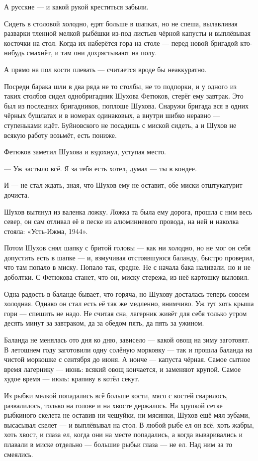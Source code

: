А русские --- и какой рукой креститься забыли.

Сидеть в столовой холодно, едят больше в шапках, но не спеша, вылавливая разварки тленной
мелкой рыбёшки из-под листьев чёрной капусты и выплёвывая косточки на стол. Когда их
наберётся гора на столе --- перед новой бригадой кто-нибудь смахнёт, и там они дохрястывают на
полу.

А прямо на пол кости плевать --- считается вроде бы неаккуратно.

Посреди барака шли в два ряда не то столбы, не то подпорки, и у одного из таких столбов сидел
однобригадник Шухова Фетюков, стерёг ему завтрак. Это был из последних бригадников, поплоше
Шухова. Снаружи бригада вся в одних чёрных бушлатах и в номерах одинаковых, а внутри шибко
неравно --- ступеньками идёт. Буйновского не посадишь с миской сидеть, а и Шухов не всякую
работу возьмёт, есть пониже.

Фетюков заметил Шухова и вздохнул, уступая место.

--- Уж застыло всё. Я за тебя есть хотел, думал --- ты в кондее.

И --- не стал ждать, зная, что Шухов ему не оставит, обе миски отштукатурит дочиста.

Шухов вытянул из валенка ложку. Ложка та была ему дорога, прошла с ним весь север, он сам
отливал её в песке из алюминиевого провода, на ней и наколка стояла: «Усть-Ижма, 1944».

Потом Шухов снял шапку с бритой головы --- как ни холодно, но не мог он себя допустить есть в
шапке --- и, взмучивая отстоявшуюся баланду, быстро проверил, что там попало в миску. Попало
так, средне. Не с начала бака наливали, но и не доболтки. С Фетюкова станет, что он, миску
стережа, из неё картошку выловил.

Одна радость в баланде бывает, что горяча, но Шухову досталась теперь совсем холодная.
Однако он стал есть её так же медленно, внимчиво. Уж тут хоть крыша гори --- спешить не надо. Не
считая сна, лагерник живёт для себя только утром десять минут за завтраком, да за обедом
пять, да пять за ужином.

Баланда не менялась ото дня ко дню, зависело --- какой овощ на зиму заготовят. В летошнем году
заготовили одну солёную морковку --- так и прошла баланда на чистой моркошке с сентября до
июня. А нонче --- капуста чёрная. Самое сытное время лагернику --- июнь: всякий овощ кончается, и
заменяют крупой. Самое худое время --- июль: крапиву в котёл секут.

Из рыбки мелкой попадались всё больше кости, мясо с костей сварилось, развалилось, только на
голове и на хвосте держалось. На хрупкой сетке рыбкиного скелета не оставив ни чешуйки, ни
мясинки, Шухов ещё мял зубами, высасывал скелет --- и выплёвывал на стол. В любой рыбе ел он
всё, хоть жабры, хоть хвост, и глаза ел, когда они на месте попадались, а когда вываривались и
плавали в миске отдельно --- большие рыбьи глаза --- не ел. Над ним за то смеялись.

